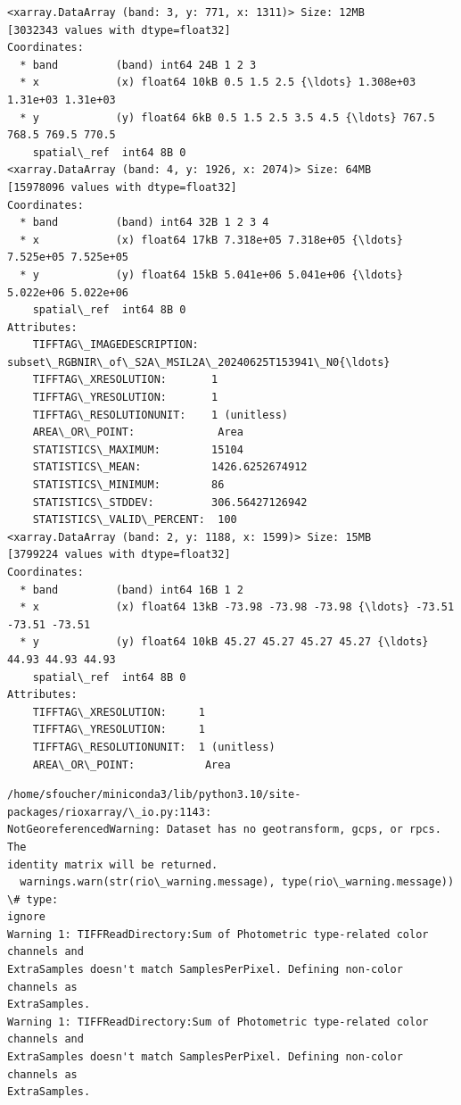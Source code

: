 \documentclass[11pt]{article}
\begin{document}
    \begin{Verbatim}[commandchars=\\\{\}]
<xarray.DataArray (band: 3, y: 771, x: 1311)> Size: 12MB
[3032343 values with dtype=float32]
Coordinates:
  * band         (band) int64 24B 1 2 3
  * x            (x) float64 10kB 0.5 1.5 2.5 {\ldots} 1.308e+03 1.31e+03 1.31e+03
  * y            (y) float64 6kB 0.5 1.5 2.5 3.5 4.5 {\ldots} 767.5 768.5 769.5 770.5
    spatial\_ref  int64 8B 0
<xarray.DataArray (band: 4, y: 1926, x: 2074)> Size: 64MB
[15978096 values with dtype=float32]
Coordinates:
  * band         (band) int64 32B 1 2 3 4
  * x            (x) float64 17kB 7.318e+05 7.318e+05 {\ldots} 7.525e+05 7.525e+05
  * y            (y) float64 15kB 5.041e+06 5.041e+06 {\ldots} 5.022e+06 5.022e+06
    spatial\_ref  int64 8B 0
Attributes:
    TIFFTAG\_IMAGEDESCRIPTION:  subset\_RGBNIR\_of\_S2A\_MSIL2A\_20240625T153941\_N0{\ldots}
    TIFFTAG\_XRESOLUTION:       1
    TIFFTAG\_YRESOLUTION:       1
    TIFFTAG\_RESOLUTIONUNIT:    1 (unitless)
    AREA\_OR\_POINT:             Area
    STATISTICS\_MAXIMUM:        15104
    STATISTICS\_MEAN:           1426.6252674912
    STATISTICS\_MINIMUM:        86
    STATISTICS\_STDDEV:         306.56427126942
    STATISTICS\_VALID\_PERCENT:  100
<xarray.DataArray (band: 2, y: 1188, x: 1599)> Size: 15MB
[3799224 values with dtype=float32]
Coordinates:
  * band         (band) int64 16B 1 2
  * x            (x) float64 13kB -73.98 -73.98 -73.98 {\ldots} -73.51 -73.51 -73.51
  * y            (y) float64 10kB 45.27 45.27 45.27 45.27 {\ldots} 44.93 44.93 44.93
    spatial\_ref  int64 8B 0
Attributes:
    TIFFTAG\_XRESOLUTION:     1
    TIFFTAG\_YRESOLUTION:     1
    TIFFTAG\_RESOLUTIONUNIT:  1 (unitless)
    AREA\_OR\_POINT:           Area
    \end{Verbatim}

    \begin{Verbatim}[commandchars=\\\{\}]
/home/sfoucher/miniconda3/lib/python3.10/site-packages/rioxarray/\_io.py:1143:
NotGeoreferencedWarning: Dataset has no geotransform, gcps, or rpcs. The
identity matrix will be returned.
  warnings.warn(str(rio\_warning.message), type(rio\_warning.message))  \# type:
ignore
Warning 1: TIFFReadDirectory:Sum of Photometric type-related color channels and
ExtraSamples doesn't match SamplesPerPixel. Defining non-color channels as
ExtraSamples.
Warning 1: TIFFReadDirectory:Sum of Photometric type-related color channels and
ExtraSamples doesn't match SamplesPerPixel. Defining non-color channels as
ExtraSamples.
    \end{Verbatim}
\end{document}
